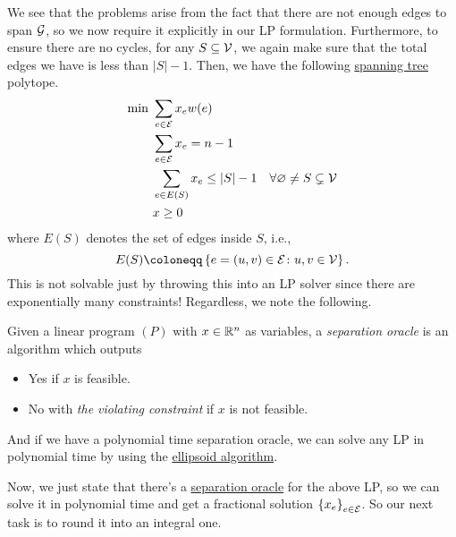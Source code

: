 We see that the problems arise from the fact that there are not enough edges to span \(\mathcal{\MakeUppercase{g}} \), so we now require it explicitly in our LP formulation. Furthermore, to ensure there are no cycles, for any \(S \subseteq \mathcal{\MakeUppercase{v}} \), we again make sure that the total edges we have is less than \(\left\vert S \right\vert - 1\). Then, we have the following \hyperref[def:spanning-tree]{spanning tree} polytope.
\begin{equation}\label{eq:spanning-tree-polytope}
	\begin{aligned}
		\min~ & \sum_{e\in \mathcal{\MakeUppercase{e}} } x_e w(e)                                                                          \\
		      & \sum_{e\in \mathcal{\MakeUppercase{e}} } x_e = n-1                                                                         \\
		      & \sum_{e\in E(S)} x_e \leq \left\vert S \right\vert - 1 & \forall \varnothing \neq S \subsetneq \mathcal{\MakeUppercase{v}} \\
		      & x \geq 0
	\end{aligned}
\end{equation}
where \(E(S)\) denotes the set of edges inside \(S\), i.e.,
\[
	E(S) \coloneqq \left\{ e=(u, v)\in \mathcal{\MakeUppercase{e}} \colon u, v\in \mathcal{\MakeUppercase{v}}  \right\}.
\]
This is not solvable just by throwing this into an LP solver since there are exponentially many constraints! Regardless, we note the following.
\begin{remark}\label{rmk:separation-oracle}
	Given a linear program \((P)\) with \(x\in \mathbb{\MakeUppercase{r}} ^n\) as variables, a \emph{separation oracle} is an algorithm which outputs
	\begin{itemize}
		\item \textsf{Yes} if \(x\) is feasible.
		\item \textsf{No} with \emph{the violating constraint} if \(x\) is not feasible.
	\end{itemize}

	And if we have a polynomial time separation oracle, we can solve any LP in polynomial time by using the \href{https://en.wikipedia.org/wiki/Ellipsoid_method}{ellipsoid algorithm}.
\end{remark}

Now, we just state that there's a \hyperref[rmk:separation-oracle]{separation oracle} for the above LP, so we can solve it in polynomial time and get a fractional solution \(\left\{ x_e \right\} _{e\in \mathcal{\MakeUppercase{e}}}\). So our next task is to round it into an integral one.

